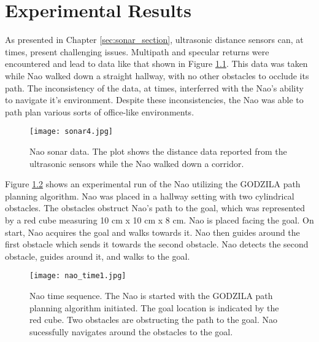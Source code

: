 \chapter{Experimental Results}

As presented in Chapter \ref{sec:sonar_section}, ultrasonic distance sensors can, at times, present challenging issues. Multipath and specular returns were encountered and lead to data like that shown in Figure \ref{fig:sonar4}. This data was taken while Nao walked down a straight hallway, with no other obstacles to occlude its path. The inconsistency of the data, at times, interferred with the Nao's ability to navigate it's environment. Despite these inconsistencies, the Nao was able to path plan various sorts of office-like environments.

\begin{figure}[H]
	\centering
	\texttt{[image: sonar4.jpg]}
	\caption[Nao sonar data.]
	{Nao sonar data. The plot shows the distance data reported from the ultrasonic sensors while the Nao walked down a corridor.}
	\label{fig:sonar4}
\end{figure}
Figure \ref{fig:naoTime1} shows an experimental run of the Nao utilizing the GODZILA path planning algorithm. Nao was placed in a hallway setting with two cylindrical obstacles. The obstacles obstruct Nao's path to the goal, which was represented by a red cube measuring 10 cm x 10 cm x 8 cm. Nao is placed facing the goal. On start, Nao acquires the goal and walks towards it. Nao then guides around the first obstacle which sends it towards the second obstacle. Nao detects the second obstacle, guides around it, and walks to the goal.

\begin{figure}[h]
	\centering
	\texttt{[image: nao\_time1.jpg]}
	\caption[Nao time sequence.]
	{Nao time sequence. The Nao is started with the GODZILA path planning algorithm initiated. The goal location is indicated by the red cube. Two obstacles are obstructing the path to the goal. Nao sucessfully navigates around the obstacles to the goal.}
	\label{fig:naoTime1}
\end{figure}
